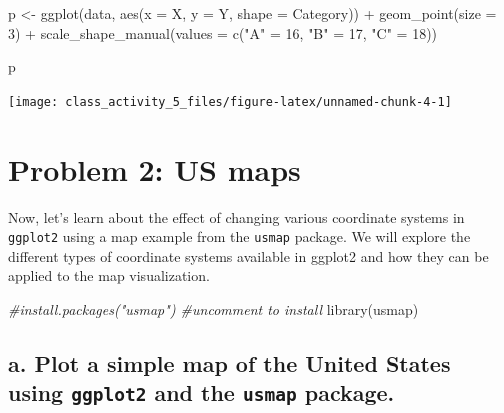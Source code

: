 \documentclass[
]{book}
\newenvironment{Shaded}{\begin{snugshade}}{\end{snugshade}}
\newcommand{\AttributeTok}[1]{\textcolor[rgb]{0.77,0.63,0.00}{#1}}
\newcommand{\CommentTok}[1]{\textcolor[rgb]{0.56,0.35,0.01}{\textit{#1}}}
\newcommand{\DecValTok}[1]{\textcolor[rgb]{0.00,0.00,0.81}{#1}}
\newcommand{\FunctionTok}[1]{\textcolor[rgb]{0.00,0.00,0.00}{#1}}
\newcommand{\NormalTok}[1]{#1}
\newcommand{\OtherTok}[1]{\textcolor[rgb]{0.56,0.35,0.01}{#1}}
\newcommand{\SpecialCharTok}[1]{\textcolor[rgb]{0.00,0.00,0.00}{#1}}
\newcommand{\StringTok}[1]{\textcolor[rgb]{0.31,0.60,0.02}{#1}}
\begin{document}
\begin{Shaded}
\begin{Highlighting}[]
\NormalTok{p }\OtherTok{\textless{}{-}} \FunctionTok{ggplot}\NormalTok{(data, }\FunctionTok{aes}\NormalTok{(}\AttributeTok{x =}\NormalTok{ X, }\AttributeTok{y =}\NormalTok{ Y, }\AttributeTok{shape =}\NormalTok{ Category)) }\SpecialCharTok{+}
  \FunctionTok{geom\_point}\NormalTok{(}\AttributeTok{size =} \DecValTok{3}\NormalTok{) }\SpecialCharTok{+}
  \FunctionTok{scale\_shape\_manual}\NormalTok{(}\AttributeTok{values =} \FunctionTok{c}\NormalTok{(}\StringTok{"A"} \OtherTok{=} \DecValTok{16}\NormalTok{, }\StringTok{"B"} \OtherTok{=} \DecValTok{17}\NormalTok{, }\StringTok{"C"} \OtherTok{=} \DecValTok{18}\NormalTok{))}

\NormalTok{p}
\end{Highlighting}
\end{Shaded}

\texttt{[image: class\_activity\_5\_files/figure-latex/unnamed-chunk-4-1]}

\hypertarget{problem-2-us-maps}{%
\section{Problem 2: US maps}\label{problem-2-us-maps}}

Now, let's learn about the effect of changing various coordinate systems in \texttt{ggplot2} using a map example from the \texttt{usmap} package. We will explore the different types of coordinate systems available in ggplot2 and how they can be applied to the map visualization.

\begin{Shaded}
\begin{Highlighting}[]
\CommentTok{\#install.packages("usmap")   \#uncomment to install}
\FunctionTok{library}\NormalTok{(usmap)}
\end{Highlighting}
\end{Shaded}

\hypertarget{a.-plot-a-simple-map-of-the-united-states-using-ggplot2-and-the-usmap-package.}{%
\subsection{\texorpdfstring{a. Plot a simple map of the United States using \texttt{ggplot2} and the \texttt{usmap} package.}{a. Plot a simple map of the United States using ggplot2 and the usmap package.}}\label{a.-plot-a-simple-map-of-the-united-states-using-ggplot2-and-the-usmap-package.}}
\end{document}
